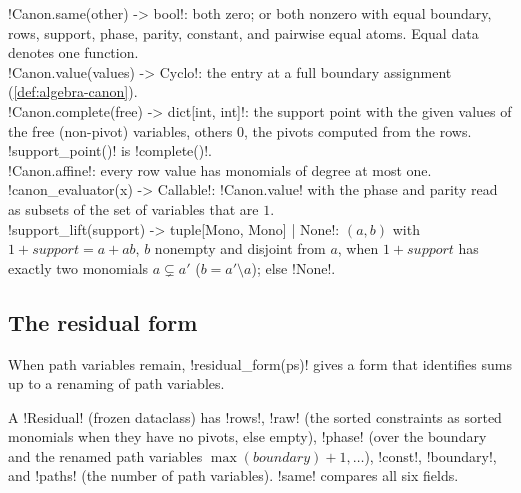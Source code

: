 \begin{signature}
\py!Canon.same(other) -> bool!: both zero; or both nonzero with equal boundary, rows, support, phase, parity, constant, and pairwise equal atoms. Equal data denotes one function.\\
\py!Canon.value(values) -> Cyclo!: the entry at a full boundary assignment (\cref{def:algebra-canon}).\\
\py!Canon.complete(free) -> dict[int, int]!: the support point with the given values of the free (non-pivot) variables, others $0$, the pivots computed from the rows. \py!support_point()! is \py!complete({})!.\\
\py!Canon.affine!: every row value has monomials of degree at most one.\\
\py!canon_evaluator(x) -> Callable!: \py!Canon.value! with the phase and parity read as subsets of the set of variables that are $1$.\\
\py!support_lift(support) -> tuple[Mono, Mono] | None!: $(a,b)$ with $1+\mathit{support}=a+ab$, $b$ nonempty and disjoint from $a$, when $1+\mathit{support}$ has exactly two monomials $a\subsetneq a'$ ($b=a'\setminus a$); else \py!None!.
\end{signature}

\subsection{The residual form}

When path variables remain, \py!residual_form(ps)! gives a form that identifies sums up to a renaming of path variables.

\begin{definition}[Residual]\label{def:algebra-residual}
A \py!Residual! (frozen dataclass) has \py!rows!, \py!raw! (the sorted constraints as sorted monomials when they have no pivots, else empty), \py!phase! (over the boundary and the renamed path variables $\max(\mathit{boundary})+1,\ldots$), \py!const!, \py!boundary!, and \py!paths! (the number of path variables). \py!same! compares all six fields.
\end{definition}

